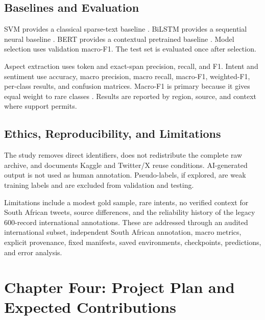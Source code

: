 \documentclass[11pt,a4paper]{article}
\begin{document}
\subsection{Baselines and Evaluation}
SVM provides a classical sparse-text baseline \citep{cortes1995}. BiLSTM provides a sequential neural baseline \citep{schuster1997}. BERT provides a contextual pretrained baseline \citep{devlin2019}. Model selection uses validation macro-F1. The test set is evaluated once after selection.

Aspect extraction uses token and exact-span precision, recall, and F1. Intent and sentiment use accuracy, macro precision, macro recall, macro-F1, weighted-F1, per-class results, and confusion matrices. Macro-F1 is primary because it gives equal weight to rare classes \citep{sokolova2009}. Results are reported by region, source, and context where support permits.

\subsection{Ethics, Reproducibility, and Limitations}
The study removes direct identifiers, does not redistribute the complete raw archive, and documents Kaggle and Twitter/X reuse conditions. AI-generated output is not used as human annotation. Pseudo-labels, if explored, are weak training labels and are excluded from validation and testing.

Limitations include a modest gold sample, rare intents, no verified context for South African tweets, source differences, and the reliability history of the legacy 600-record international annotations. These are addressed through an audited international subset, independent South African annotation, macro metrics, explicit provenance, fixed manifests, saved environments, checkpoints, predictions, and error analysis.

\clearpage
\section{Chapter Four: Project Plan and Expected Contributions}
\end{document}

